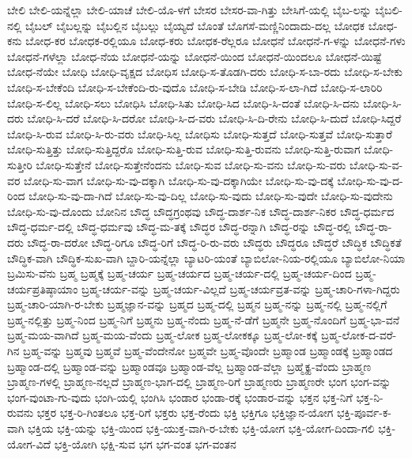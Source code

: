 {ಬೇಲಿ
ಬೇಲಿ-ಯನ್ನೆಲ್ಲಾ
ಬೇಲಿ-ಯಾಚೆ
ಬೇಲಿ-ಯೊ-ಳಗೆ
ಬೇಸರ
ಬೇಸರ-ವಾ-ಗಿತ್ತು
ಬೇಸಿಗೆ-ಯಲ್ಲಿ
ಬೈಬ-ಲನ್ನು
ಬೈಬಲಿ-ನಲ್ಲಿ
ಬೈಬಲ್
ಬೈಬಲ್ಲನ್ನು
ಬೈಬಲ್ಲಿನ
ಬೈಬಲ್ಲು
ಬೈಯ್ಯದೆ
ಬೊಂತೆ
ಬೊಗಸೆ-ಮಣ್ಣಿನಿಂದಾದು-ದಲ್ಲ
ಬೋಧಕ
ಬೋಧ-ಕನು
ಬೋಧ-ಕರ
ಬೋಧಕ-ರಲ್ಲಿಯೂ
ಬೋಧ-ಕರು
ಬೋಧಕ-ರೆಲ್ಲರೂ
ಬೋಧನೆ
ಬೋಧನೆ-ಗ-ಳನ್ನು
ಬೋಧನೆ-ಗಳು
ಬೋಧನೆ-ಗಳೆಲ್ಲಾ
ಬೋಧ-ನೆಯ
ಬೋಧನೆ-ಯನ್ನು
ಬೋಧನೆ-ಯಿಂದ
ಬೋಧನೆ-ಯಿಂದಲೂ
ಬೋಧನೆ-ಯಿಷ್ಟೆ
ಬೋಧ-ನೆಯೇ
ಬೋಧಿ
ಬೋಧಿ-ವೃಕ್ಷದ
ಬೋಧಿಸ
ಬೋಧಿ-ಸ-ತೊಡಗಿ-ದರು
ಬೋಧಿ-ಸ-ಬಾ-ರದು
ಬೋಧಿ-ಸ-ಬೇಕು
ಬೋಧಿ-ಸ-ಬೇಕೆಂದಿ
ಬೋಧಿ-ಸ-ಬೇಕೆಂದಿ-ರು-ವುದೊ
ಬೋಧಿ-ಸ-ಬೇಡಿ
ಬೋಧಿ-ಸ-ಲಾ-ಗಿದೆ
ಬೋಧಿ-ಸ-ಲಾರಿರಿ
ಬೋಧಿ-ಸ-ಲಿಲ್ಲ
ಬೋಧಿ-ಸಲು
ಬೋಧಿಸಿ
ಬೋಧಿ-ಸಿತು
ಬೋಧಿ-ಸಿದ
ಬೋಧಿ-ಸಿ-ದಂತೆ
ಬೋಧಿ-ಸಿ-ದನು
ಬೋಧಿ-ಸಿ-ದರು
ಬೋಧಿ-ಸಿ-ದರೆ
ಬೋಧಿ-ಸಿ-ದರೋ
ಬೋಧಿ-ಸಿ-ದ-ವರು
ಬೋಧಿ-ಸಿ-ದಿ-ರೇನು
ಬೋಧಿ-ಸಿ-ದುದೆ
ಬೋಧಿ-ಸಿದ್ದರೆ
ಬೋಧಿ-ಸಿ-ರುವ
ಬೋಧಿ-ಸಿ-ರು-ವರು
ಬೋಧಿ-ಸಿಲ್ಲ
ಬೋಧಿಸು
ಬೋಧಿ-ಸುತ್ತದೆ
ಬೋಧಿ-ಸುತ್ತವೆ
ಬೋಧಿ-ಸುತ್ತಾರೆ
ಬೋಧಿ-ಸುತ್ತಿತ್ತು
ಬೋಧಿ-ಸುತ್ತಿದ್ದರೊ
ಬೋಧಿ-ಸುತ್ತಿ-ರುವ
ಬೋಧಿ-ಸುತ್ತಿ-ರುವನು
ಬೋಧಿ-ಸುತ್ತಿ-ರುವಾಗ
ಬೋಧಿ-ಸುತ್ತೀರಿ
ಬೋಧಿ-ಸುತ್ತೇನೆ
ಬೋಧಿ-ಸುತ್ತೇನೆಂದನು
ಬೋಧಿ-ಸುವ
ಬೋಧಿ-ಸು-ವನು
ಬೋಧಿ-ಸು-ವರು
ಬೋಧಿ-ಸು-ವ-ವರ
ಬೋಧಿ-ಸು-ವಾಗ
ಬೋಧಿ-ಸು-ವು-ದಕ್ಕಾಗಿ
ಬೋಧಿ-ಸು-ವು-ದಕ್ಕಾಗಿಯೇ
ಬೋಧಿ-ಸು-ವು-ದಕ್ಕೆ
ಬೋಧಿ-ಸು-ವು-ದ-ರಿಂದ
ಬೋಧಿ-ಸು-ವು-ದಾ-ಗಿದೆ
ಬೋಧಿ-ಸು-ವು-ದಿಲ್ಲ
ಬೋಧಿ-ಸು-ವುದು
ಬೋಧಿ-ಸು-ವುದೇ
ಬೋಧಿ-ಸು-ವುದೇನು
ಬೋಧಿ-ಸು-ವು-ದೊಂದು
ಬೋನಿನ
ಬೌದ್ಧ
ಬೌದ್ಧಗ್ರಂಥವು
ಬೌದ್ಧ-ದಾರ್ಶ-ನಿಕ
ಬೌದ್ಧ-ದಾರ್ಶ-ನಿಕರ
ಬೌದ್ಧ-ಧರ್ಮದ
ಬೌದ್ಧ-ಧರ್ಮ-ದಲ್ಲಿ
ಬೌದ್ಧ-ಧರ್ಮವು
ಬೌದ್ಧ-ಮ-ತಕ್ಕೆ
ಬೌದ್ಧರ
ಬೌದ್ಧ-ರನ್ನಾಗಿ
ಬೌದ್ಧ-ರನ್ನು
ಬೌದ್ಧ-ರಲ್ಲಿ
ಬೌದ್ಧ-ರಾ-ದರು
ಬೌದ್ಧ-ರಾ-ದರೋ
ಬೌದ್ಧ-ರಿಗೂ
ಬೌದ್ಧ-ರಿಗೆ
ಬೌದ್ಧ-ರಿ-ರು-ವರು
ಬೌದ್ಧರು
ಬೌದ್ಧರೂ
ಬೌದ್ಧರೆ
ಬೌದ್ಧಿಕ
ಬೌದ್ಧಿಕತೆ
ಬೌದ್ಧಿಕ-ವಾಗಿ
ಬೌದ್ಧಿಕ-ಸುಖ-ವಾಗಿ
ಬ್ದಾರಿ-ಯನ್ನೆಲ್ಲಾ
ಬ್ಯಾಟರಿ-ಯಂತೆ
ಬ್ಯಾಬಿಲೋ-ನಿಯ-ರಲ್ಲಿಯೂ
ಬ್ಯಾಬಿಲೋ-ನಿಯಾ
ಬ್ರಮಿಸು-ವೆನು
ಬ್ರಹ್ಮ
ಬ್ರಹ್ಮಕ್ಕೆ
ಬ್ರಹ್ಮ-ಚರ್ಯ
ಬ್ರಹ್ಮ-ಚರ್ಯದ
ಬ್ರಹ್ಮ-ಚರ್ಯ-ದಲ್ಲಿ
ಬ್ರಹ್ಮ-ಚರ್ಯ-ದಿಂದ
ಬ್ರಹ್ಮ-ಚರ್ಯಪ್ರತಿಷ್ಠಾಯಾಂ
ಬ್ರಹ್ಮ-ಚರ್ಯ-ವನ್ನು
ಬ್ರಹ್ಮ-ಚರ್ಯ-ವಿಲ್ಲದೆ
ಬ್ರಹ್ಮ-ಚರ್ಯವ್ರತ-ವನ್ನು
ಬ್ರಹ್ಮ-ಚಾರಿ-ಗಳಾ-ಗಿದ್ದರು
ಬ್ರಹ್ಮ-ಚಾರಿ-ಯಾಗಿ-ರ-ಬೇಕು
ಬ್ರಹ್ಮಜ್ಞಾನ-ವನ್ನು
ಬ್ರಹ್ಮದ
ಬ್ರಹ್ಮ-ದಲ್ಲಿ
ಬ್ರಹ್ಮನ
ಬ್ರಹ್ಮ-ನನ್ನು
ಬ್ರಹ್ಮ-ನಲ್ಲಿ
ಬ್ರಹ್ಮ-ನಲ್ಲಿಗೆ
ಬ್ರಹ್ಮ-ನಲ್ಲಿತ್ತು
ಬ್ರಹ್ಮ-ನಿಂದ
ಬ್ರಹ್ಮ-ನಿಗೆ
ಬ್ರಹ್ಮನು
ಬ್ರಹ್ಮ-ನೆಂದು
ಬ್ರಹ್ಮ-ನೆ-ಡೆಗೆ
ಬ್ರಹ್ಮನೇ
ಬ್ರಹ್ಮ-ನೊಂದಿಗೆ
ಬ್ರಹ್ಮ-ಭಾ-ವನೆ
ಬ್ರಹ್ಮ-ಮಯ-ವಾಗಿದೆ
ಬ್ರಹ್ಮ-ಮಯ-ವೆಂದು
ಬ್ರಹ್ಮ-ಲೋಕ
ಬ್ರಹ್ಮ-ಲೋಕಕ್ಕೂ
ಬ್ರಹ್ಮ-ಲೋ-ಕಕ್ಕೆ
ಬ್ರಹ್ಮ-ಲೋಕ-ದ-ವರೆ-ಗಿನ
ಬ್ರಹ್ಮ-ವನ್ನು
ಬ್ರಹ್ಮವು
ಬ್ರಹ್ಮವೆ
ಬ್ರಹ್ಮ-ವೆಂದೇನೋ
ಬ್ರಹ್ಮವೇ
ಬ್ರಹ್ಮ-ವೊಂದೇ
ಬ್ರಹ್ಮಾಂಡ
ಬ್ರಹ್ಮಾಂಡಕ್ಕೆ
ಬ್ರಹ್ಮಾಂಡದ
ಬ್ರಹ್ಮಾಂಡ-ದಲ್ಲಿ
ಬ್ರಹ್ಮಾಂಡ-ವನ್ನು
ಬ್ರಹ್ಮಾಂಡವೂ
ಬ್ರಹ್ಮಾಂಡ-ವೆಲ್ಲ
ಬ್ರಹ್ಮಾಂಡ-ವೆಲ್ಲಾ
ಬ್ರಹ್ಮೈಕ್ಯ-ವೆಂದು
ಬ್ರಾಹ್ಮಣ
ಬ್ರಾಹ್ಮಣ-ಗಳಲ್ಲಿ
ಬ್ರಾಹ್ಮಣ-ನಲ್ಲದೆ
ಬ್ರಾಹ್ಮಣ-ಭಾಗ-ದಲ್ಲಿ
ಬ್ರಾಹ್ಮಣ-ರಿಗೆ
ಬ್ರಾಹ್ಮಣರು
ಬ್ರಾಹ್ಮಣರೇ
ಭಂಗ
ಭಂಗ-ವನ್ನು
ಭಂಗ-ವುಂಟಾ-ಗು-ವುದು
ಭಂಗಿ-ಯಲ್ಲಿ
ಭಂಗಿಸಿ
ಭಂಡಾರ
ಭಂಡಾ-ರಕ್ಕೆ
ಭಂಡಾರ-ವನ್ನು
ಭಕ್ತನ
ಭಕ್ತ-ನಿಗೆ
ಭಕ್ತ-ನಿ-ರುವನು
ಭಕ್ತರ
ಭಕ್ತ-ರಿ-ಗಿಂತಲೂ
ಭಕ್ತ-ರಿಗೆ
ಭಕ್ತರು
ಭಕ್ತ-ರೆಂದು
ಭಕ್ತಿ
ಭಕ್ತಿಗೂ
ಭಕ್ತಿಜ್ಞಾನ-ಯೋಗ
ಭಕ್ತಿ-ಪೂರ್ವ-ಕ-ವಾಗಿ
ಭಕ್ತಿಯ
ಭಕ್ತಿ-ಯನ್ನು
ಭಕ್ತಿ-ಯಿಂದ
ಭಕ್ತಿ-ಯುಕ್ತ-ವಾಗಿ-ರ-ಬೇಕು
ಭಕ್ತಿ-ಯೋಗ
ಭಕ್ತಿ-ಯೋಗ-ದಿಂದಾ-ಗಲಿ
ಭಕ್ತಿ-ಯೋಗ-ವಿದೆ
ಭಕ್ತಿ-ಯೋಗಿ
ಭಕ್ಷಿ-ಸುವ
ಭಗ
ಭಗ-ವಂತ
ಭಗ-ವಂತನ
}
